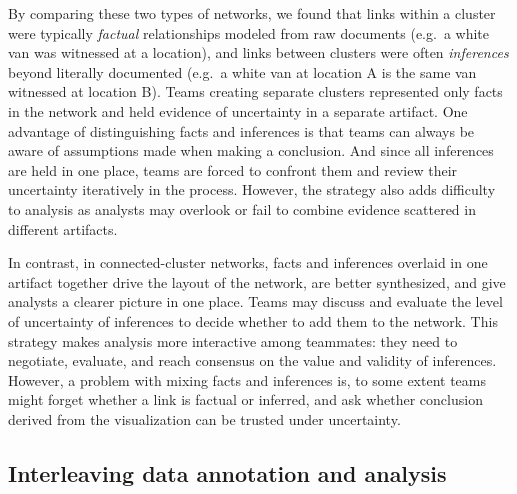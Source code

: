 
By comparing these two types of networks, we found that links within a cluster were typically
\emph{factual} relationships modeled from raw documents (e.g.~a white van was
witnessed at a location), and links between clusters were often
\emph{inferences} beyond literally documented (e.g.~a white van at location A
is the same van witnessed at location B). Teams creating separate
clusters represented only facts in the network and held evidence of
uncertainty in a separate artifact. One advantage of distinguishing
facts and inferences is that teams can always be aware of assumptions made when
making a conclusion. And since all inferences are held in one place,
teams are forced to confront them and review their uncertainty
iteratively in the process. However, the strategy also adds difficulty
to analysis as analysts may overlook or fail to combine evidence
scattered in different artifacts.

% 


In contrast, in connected-cluster networks, facts and inferences overlaid in one artifact together drive the layout of the
network, are better synthesized, and give analysts a clearer picture in one place. Teams may discuss and evaluate the level of uncertainty of inferences to decide whether to add them to the
network. This strategy makes analysis more interactive among teammates:
they need to negotiate, evaluate, and reach consensus on the value and
validity of inferences. However, a problem with mixing facts and inferences is, to some extent teams might forget whether a
link is factual or inferred, and ask whether conclusion derived
from the visualization can be trusted under uncertainty.


\subsection{Interleaving data annotation and analysis}\label{interleaving-data-annotation-and-data-analysis}



